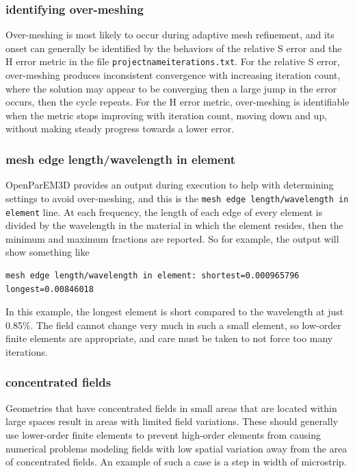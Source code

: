 \documentclass[titlepage]{article}
\renewcommand\_{\textunderscore\linebreak[1]}
\begin{document}
\subsubsection{identifying over-meshing}

Over-meshing is most likely to occur during adaptive mesh refinement, and its onset can generally be identified by  the behaviors of the relative S error and the H error metric in the file \texttt{projectname\_iterations.txt}.  For the relative S error, over-meshing produces inconsistent convergence with increasing iteration count, where the solution may appear to be converging then a large jump in the error occurs, then the cycle repeats.  For the H error metric, over-meshing is identifiable when the metric stops improving with iteration count, moving down and up, without making steady progress towards a lower error.  

\subsubsection{mesh edge length/wavelength in element}

OpenParEM3D provides an output during execution to help with determining settings to avoid over-meshing, and this is the \texttt{mesh edge length/wavelength in element} line.  At each frequency, the length of each edge of every element is divided by the wavelength in the material in which the element resides, then the minimum and maximum fractions are reported.  So for example, the output will show something like
\begin{Verbatim}[fontsize=\small]
    mesh edge length/wavelength in element: shortest=0.000965796 longest=0.00846018
\end{Verbatim}
In this example, the longest element is short compared to the wavelength at just 0.85\%.  The field cannot change very much in such a small element, so low-order finite elements are appropriate, and care must be taken to not force too many iterations.

\subsubsection{concentrated fields}

Geometries that have concentrated fields in small areas that are located within large spaces result in areas with limited field variations.  These should generally use lower-order finite elements to prevent high-order elements from causing numerical problems modeling fields with low spatial variation away from the area of concentrated fields.  An example of such a case is a step in width of microstrip.
\end{document}

